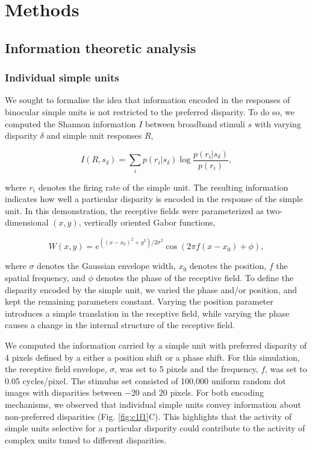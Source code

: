 \section{Methods}

\subsection*{Information theoretic analysis}

\subsubsection*{Individual simple units}
We sought to formalise the idea that information encoded in the responses of binocular simple units is not restricted to the preferred disparity. To do so, we computed the Shannon information $I$ between broadband stimuli $s$ with varying disparity $\delta$ and simple unit responses $R$,

\begin{equation}
  I(R, s_\delta) = \sum_i p(r_i|s_\delta) \log \frac{p(r_i|s_\delta)}{p(r_i)},
  \label{eq:ShannonInformation}
\end{equation}
 
where $r_i$ denotes the firing rate of the simple unit. The resulting information indicates how well a particular disparity is encoded in the response of the simple unit. In this demonstration, the receptive fields were parameterized as two-dimensional $(x,y)$, vertically oriented Gabor functions,

\begin{equation}
  W(x,y) = e^{((x-x_0)^2 + y^2)/2\sigma^2} \cos (2 \pi f (x-x_0) + \phi),
\end{equation}

where $\sigma$ denotes the Gaussian envelope width, $x_0$ denotes the position, $f$ the spatial frequency, and $\phi$ denotes the phase of the receptive field. To define the disparity encoded by the simple unit, we varied the phase and/or position, and kept the remaining parameters constant. Varying the position parameter introduces a simple translation in the receptive field, while varying the phase causes a change in the internal structure of the receptive field. 

We computed the information carried by a simple unit with preferred disparity of 4 pixels defined by a either a position shift or a phase shift. For this simulation, the receptive field envelope, $\sigma$, was set to 5 pixels and the frequency, $f$, was set to 0.05 cycles/pixel. The stimulus set consisted of 100,000 uniform random dot images with disparities between $-$20 and 20 pixels. For both encoding mechanisms, we observed that individual simple units convey information about non-preferred disparities (Fig. \ref{fig:c1f1}C). This highlights that the activity of simple units selective for a particular disparity could contribute to the activity of complex units tuned to different disparities.

